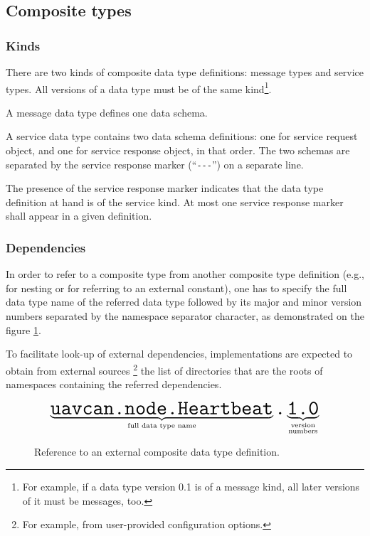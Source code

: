 \subsection{Composite types}\label{sec:dsdl_composite_types}

\subsubsection{Kinds}

There are two kinds of composite data type definitions: message types and service types.
All versions of a data type must be of the same kind\footnote{%
For example, if a data type version 0.1 is of a message kind, all later versions of it must be messages, too.}.

A message data type defines one data schema.

A service data type contains two data schema definitions:
one for service request object, and one for service response object, in that order.
The two schemas are separated by the service response marker (``\verb|---|'') on a separate line.

The presence of the service response marker indicates that the data type definition at hand is of the service kind.
At most one service response marker shall appear in a given definition.

\subsubsection{Dependencies}

In order to refer to a composite type from another composite type definition
(e.g., for nesting or for referring to an external constant),
one has to specify the full data type name of the referred data type followed by its
major and minor version numbers separated by the namespace separator character,
as demonstrated on the figure \ref{fig:dsdl_nested_reference}.

To facilitate look-up of external dependencies,
implementations are expected to obtain from external sources%
\footnote{For example, from user-provided configuration options.}
the list of directories that are the roots of namespaces containing the referred dependencies.

\begin{figure}[H]
    $$
    \underbrace{\texttt{\huge{uavcan.node.Heartbeat}}}_{\text{full data type name}}%
    \texttt{\huge{.}}%
    \underbrace{\texttt{\huge{1.0}}}_{\substack{\text{version} \\ \text{numbers}}}%
    $$
    \caption{Reference to an external composite data type definition.\label{fig:dsdl_nested_reference}}
\end{figure}

